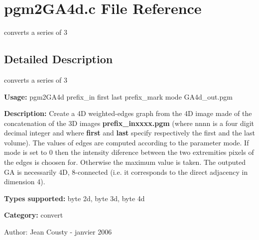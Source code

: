\section{pgm2GA4d.c File Reference}
\label{pgm2GA4d_8c}
converts a series of 3 



\subsection{Detailed Description}
converts a series of 3 

{\bf Usage:} pgm2GA4d prefix\_\-in first last prefix\_\-mark mode GA4d\_\-out.pgm

{\bf Description:} Create a 4D weighted-edges graph from the 4D image made of the concatenation of the 3D images {\bf prefix\_\-inxxxx.pgm} (where nnnn is a four digit decimal integer and where {\bf first} and {\bf last} specify respectively the first and the last volume). The values of edges are computed according to the parameter mode. If mode is set to 0 then the intensity diference between the two extremities pixels of the edges is choosen for. Otherwise the maximum value is taken. The outputed GA is necessarily 4D, 8-connected (i.e. it corresponds to the direct adjacency in dimension 4).

{\bf Types supported:} byte 2d, byte 3d, byte 4d

{\bf Category:} convert

\begin{Desc}
\item[Author:]Jean Cousty - janvier 2006 \end{Desc}
